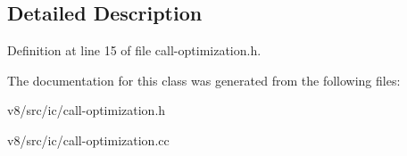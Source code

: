 \subsection{Detailed Description}


Definition at line 15 of file call-\/optimization.\+h.



The documentation for this class was generated from the following files\+:\begin{DoxyCompactItemize}
\item 
v8/src/ic/call-\/optimization.\+h\item 
v8/src/ic/call-\/optimization.\+cc\end{DoxyCompactItemize}
